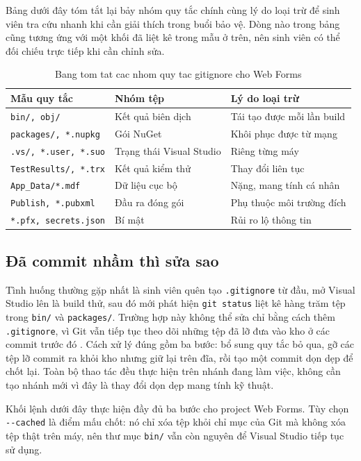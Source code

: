 Bảng dưới đây tóm tắt lại bảy nhóm quy tắc chính cùng lý do loại trừ để sinh viên tra cứu nhanh khi cần giải thích trong buổi bảo vệ.
Dòng nào trong bảng cũng tương ứng với một khối đã liệt kê trong mẫu ở trên, nên sinh viên có thể đối chiếu trực tiếp khi cần chỉnh sửa.

\begin{table}[H]
\centering
\begin{tabular}{lll}
\toprule
Mẫu quy tắc & Nhóm tệp & Lý do loại trừ \\
\midrule
\texttt{bin/, obj/} & Kết quả biên dịch & Tái tạo được mỗi lần build \\
\texttt{packages/, *.nupkg} & Gói NuGet & Khôi phục được từ mạng \\
\texttt{.vs/, *.user, *.suo} & Trạng thái Visual Studio & Riêng từng máy \\
\texttt{TestResults/, *.trx} & Kết quả kiểm thử & Thay đổi liên tục \\
\texttt{App\_Data/*.mdf} & Dữ liệu cục bộ & Nặng, mang tính cá nhân \\
\texttt{Publish, *.pubxml} & Đầu ra đóng gói & Phụ thuộc môi trường đích \\
\texttt{*.pfx, secrets.json} & Bí mật & Rủi ro lộ thông tin \\
\bottomrule
\end{tabular}
\caption{Bang tom tat cac nhom quy tac gitignore cho Web Forms}
\label{tab:pb-gitignore-nhom}
\end{table}

\subsection{Đã commit nhầm thì sửa sao}

Tình huống thường gặp nhất là sinh viên quên tạo \verb|.gitignore| từ đầu, mở Visual Studio lên là build thử, sau đó mới phát hiện \verb|git status| liệt kê hàng trăm tệp trong \verb|bin/| và \verb|packages/|.
Trường hợp này không thể sửa chỉ bằng cách thêm \verb|.gitignore|, vì Git vẫn tiếp tục theo dõi những tệp đã lỡ đưa vào kho ở các commit trước đó \cite{progit,atlassiangit}.
Cách xử lý đúng gồm ba bước: bổ sung quy tắc bỏ qua, gỡ các tệp lỡ commit ra khỏi kho nhưng giữ lại trên đĩa, rồi tạo một commit dọn dẹp để chốt lại.
Toàn bộ thao tác đều thực hiện trên nhánh đang làm việc, không cần tạo nhánh mới vì đây là thay đổi dọn dẹp mang tính kỹ thuật.

Khối lệnh dưới đây thực hiện đầy đủ ba bước cho project Web Forms. Tùy chọn \verb|--cached| là điểm mấu chốt: nó chỉ xóa tệp khỏi chỉ mục của Git mà không xóa tệp thật trên máy, nên thư mục \verb|bin/| vẫn còn nguyên để Visual Studio tiếp tục sử dụng.

